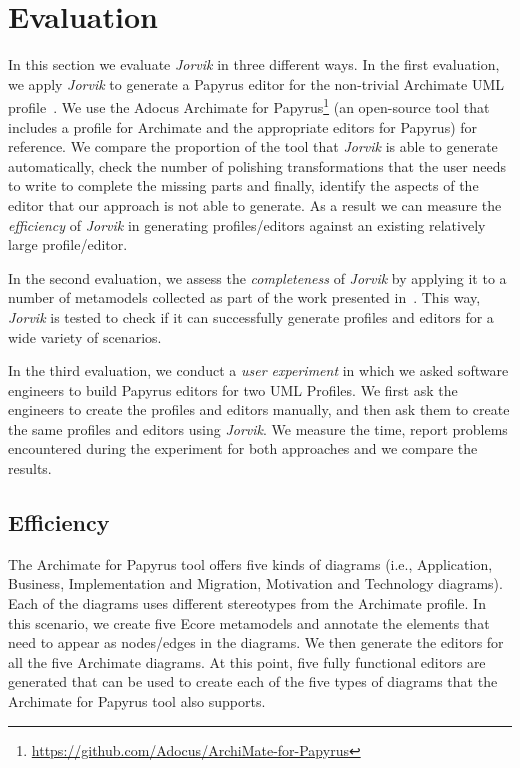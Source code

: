 \section{Evaluation}
\label{sec:evaluation}

In this section we evaluate \textit{Jorvik} in three different ways. 
In the first evaluation, we apply \textit{Jorvik} to generate a Papyrus editor for the non-trivial Archimate UML profile~\cite{iacob2009archimate,haren2012archimate}. 
We use the Adocus Archimate for Papyrus\footnote{\url{https://github.com/Adocus/ArchiMate-for-Papyrus}} (an open-source tool that includes a profile for Archimate and the appropriate editors for Papyrus) for reference. 
We compare the proportion of the tool that \textit{Jorvik} is able to generate automatically, check the number of polishing transformations that the user needs to write to complete the missing parts and finally, identify the aspects of the editor that our approach is not able to generate.
As a result we can measure the \textit{efficiency} of \textit{Jorvik} in generating profiles/editors against an existing relatively large profile/editor. 

In the second evaluation, we assess the \textit{completeness} of \textit{Jorvik} by applying it to a number of metamodels collected as part of the work presented in~\cite{williams2013metamodels}. 
This way, \textit{Jorvik} is tested to check if it can successfully generate profiles and editors for a wide variety of scenarios.

In the third evaluation, we conduct a \textit{user experiment} in which we asked software engineers to build Papyrus editors for two UML Profiles.
We first ask the engineers to create the profiles and editors manually, and then ask them to create the same profiles and editors using \textit{Jorvik}. 
We measure the time, report problems encountered during the experiment for both approaches and we compare the results.

\subsection{Efficiency}
\label{sec:efficiencyEvaluation}
The Archimate for Papyrus tool offers five kinds of diagrams (i.e., Application, Business, Implementation and Migration, Motivation and Technology diagrams). 
Each of the diagrams uses different stereotypes from the Archimate profile. 
In this scenario, we create five Ecore metamodels and annotate the elements that need to appear as nodes/edges in the diagrams. 
We then generate the editors for all the five Archimate diagrams.
At this point, five fully functional editors are generated that can be used to create each of the five types of diagrams that the Archimate for Papyrus tool also supports. 

